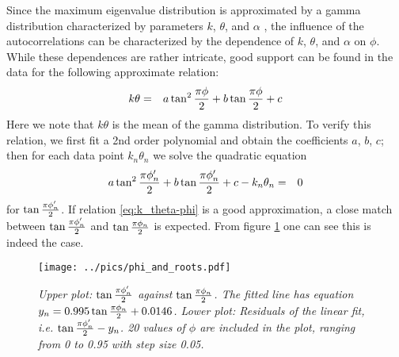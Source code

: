 Since the maximum eigenvalue distribution is approximated by a gamma
distribution characterized by parameters $k$, $\theta$, and $\alpha$
\footnotemark, the influence of the autocorrelations can be
characterized by the dependence of $k$, $\theta$, and  $\alpha$ on
$\phi$. While these dependences are rather intricate, good support can
be found in the data for the following approximate relation:
\begin{eqnarray}
  k\theta &=& a \tan^2{\pi \phi \over 2} + b\tan{\pi \phi \over 2} +
  c \label{eq:k_theta-phi}
\end{eqnarray}
Here we note that $k\theta$ is the mean of the gamma distribution.
To verify this relation, we first fit a 2nd order polynomial and
obtain the coefficients $a$, $b$, $c$; then for each data point
$k_n\theta_n$ we solve the quadratic equation
\begin{eqnarray}
  a \tan^2{\pi \phi'_n \over 2} + b\tan{\pi \phi'_n \over 2} + c -
  k_n\theta_n &=& 0\label{eq:k_theta-phi_2}
\end{eqnarray}
for $\tan{\pi \phi'_n \over 2}$. If relation \ref{eq:k_theta-phi} is a
good approximation, a close match between $\tan{\pi \phi'_n \over 2}$
and $\tan{\pi \phi_n \over 2}$ is expected. From figure 
\ref{fig:phi_and_roots} one can see this is indeed the case.

\begin{figure}[htb!]
  \centering
    \texttt{[image: ../pics/phi\_and\_roots.pdf]}
  \caption{\small \it Upper plot: $\tan{\pi \phi'_n \over 2}$ against
    $\tan{\pi \phi_n \over 2}$. The fitted line has equation $y_n =
    0.995 \tan{\pi \phi_n \over 2} + 0.0146$. Lower plot: Residuals of
    the linear fit, i.e. $\tan{\pi \phi'_n \over 2} - y_n$. 20 values
    of $\phi$ are included in the plot, ranging from 0 to 0.95 with
    step size 0.05.}
  \label{fig:phi_and_roots}
\end{figure}

